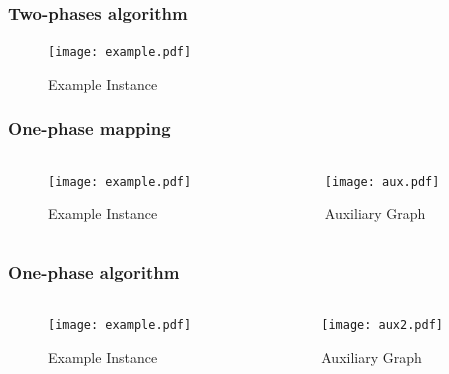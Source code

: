 \documentclass[english]{beamer}
\begin{document}
\begin{frame}
  \frametitle{Two-phases algorithm}
  \begin{figure}
    \centering
    \texttt{[image: example.pdf]}
    \caption{Example Instance}
  \end{figure}
\end{frame}
\begin{frame}
\frametitle{One-phase mapping}
\begin{columns}
\begin{column}{0.35\textwidth}
  \begin{figure}
    \centering
    \texttt{[image: example.pdf]}
    \caption{Example Instance}
  \end{figure}
\end{column}
\begin{column}{0.45\textwidth}
  \begin{figure}
    \centering
    \texttt{[image: aux.pdf]}
    \caption{Auxiliary Graph}
  \end{figure}
\end{column}
\end{columns}
\end{frame}
\begin{frame}
\frametitle{One-phase algorithm}
\begin{columns}
\begin{column}{0.35\textwidth}
  \begin{figure}
    \centering
    \texttt{[image: example.pdf]}
    \caption{Example Instance}
  \end{figure}
\end{column}
\begin{column}{0.45\textwidth}
  \begin{figure}
    \centering
    \texttt{[image: aux2.pdf]}
    \caption{Auxiliary Graph}
  \end{figure}
\end{column}
\end{columns}
\end{frame}
\end{document}

